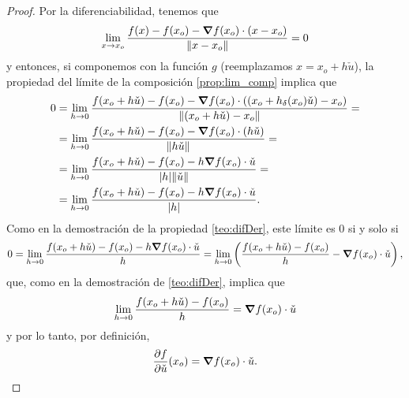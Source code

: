 \begin{theorem}
\begin{proof}
Por la diferenciabilidad, tenemos que 
\[
 \lim_{x \to x_o} \frac{f(x) - f(x_o) - \grad f (x_o) \cdot (x - x_o)}
                                 {\norm{x - x_o}} = 0
\]
y entonces, si componemos con la funci\'on $g$ (reemplazamos $x = x_o + h \check{u}$), la propiedad del l\'imite de la composici\'on \eqref{prop:lim_comp} implica que
\begin{align*}
  0 & = \lim_{h \to 0} \frac{f(x_o + h \check{u}) - f(x_o) - \grad f (x_o) \cdot ((x_o + h _{\delta}(x_o)\check{u}) - x_o) }
                    {\norm{(x_o + h \check{u}) - x_o}} = \\
    & = \lim_{h \to 0} \frac{f(x_o + h \check{u}) - f(x_o) - \grad f (x_o) \cdot (h \check{u}) }
                    {\norm{h \check{u}}} = \\
    & = \lim_{h \to 0} \frac{f(x_o + h \check{u}) - f(x_o) - h \grad f (x_o) \cdot \check{u} }
                    {\abs{h} \norm{\check{u}}} = \\
    & = \lim_{h \to 0} \frac{f(x_o + h \check{u}) - f(x_o) - h \grad f (x_o) \cdot \check{u} }
                    {\abs{h}}.  
\end{align*}                                
Como en la demostraci\'on de la propiedad \eqref{teo:difDer}, este l\'imite es $0$ si y solo si
\[
 0 = \lim_{h \to 0} \frac{f(x_o + h \check{u}) - f(x_o) - h \grad f (x_o) \cdot \check{u}}{h} = 
     \lim_{h \to 0} \left( \frac{f(x_o + h \check{u}) - f(x_o)}{h} - \grad f (x_o) \cdot \check{u} \right),
\]
que, como en la demostraci\'on de \eqref{teo:difDer}, implica que 
\[
 \lim_{h \to 0} \frac{f(x_o + h \check{u}) - f(x_o)}{h} = \grad f (x_o) \cdot \check{u}
\]
y por lo tanto, por definici\'on,
\[
 \frac{\partial f}{\partial \check{u}} (x_o) = \grad f (x_o) \cdot \check{u}.
\]
 \end{proof}
\end{theorem}

